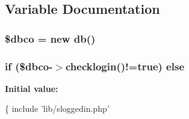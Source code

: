 \subsection{Variable Documentation}
\hypertarget{index_8php_a2998f304f663e07feaa31e5df9d715dc}{
\subsubsection[{\$dbco}]{\setlength{\rightskip}{0pt plus 5cm}\$dbco = new {\bf db}()}}\label{index_8php_a2998f304f663e07feaa31e5df9d715dc}
\hypertarget{index_8php_a0da35c754a10b2ea574c4cc3d8e7c571}{
\subsubsection[{else}]{\setlength{\rightskip}{0pt plus 5cm}if (\$dbco-\/$>$checklogin()!=true) else}}\label{index_8php_a0da35c754a10b2ea574c4cc3d8e7c571}
{\bfseries Initial value\-:}
\begin{DoxyCode}
\{
  include \textcolor{stringliteral}{'lib/sloggedin.php'}
\end{DoxyCode}
